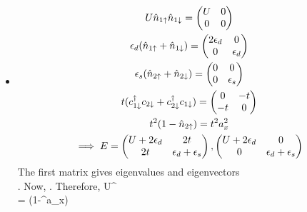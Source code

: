 \documentclass[12pt]{article}
\begin{document}
\subsection{}
\begin{itemize}
    \item {}
	\begin{gather}
	    U\hat n_{1\uparrow}\hat n_{1\downarrow}=\begin{pmatrix}U& 0 \\ 0 & 0 \end{pmatrix}\\
	    \epsilon_d(\hat n_{1\uparrow}+\hat n_{1\downarrow})=\begin{pmatrix}2\epsilon_d & 0 \\ 0 & \epsilon_d \end{pmatrix}\\
	\epsilon_s(\hat n_{2\uparrow}+\hat n_{2\downarrow})=\begin{pmatrix}0 & 0 \\ 0 & \epsilon_s \end{pmatrix}\\
	t(c_{1\downarrow}^\dagger c_{2\downarrow}+c_{2\downarrow}^\dagger c_{1\downarrow})=\begin{pmatrix}0 & -t \\ -t & 0 \end{pmatrix}\\
	    t^2(1-\hat n_{2\uparrow})=t^2 a_x^2\\
	\implies E= \begin{pmatrix}U+2\epsilon_d & 2t \\ 2t & \epsilon_d + \epsilon_s \end{pmatrix}, \begin{pmatrix}U+2\epsilon_d & 0 \\ 0 & \epsilon_d + \epsilon_s \end{pmatrix}
	\end{gather}
	The first matrix gives eigenvalues  and eigenvectors \\. Now, . Therefore,
	\beq
	U^\dagger{} \\
	= (1-\cd^\dagger\ca\hat a_x)\\

\end{itemize}
\end{document}
